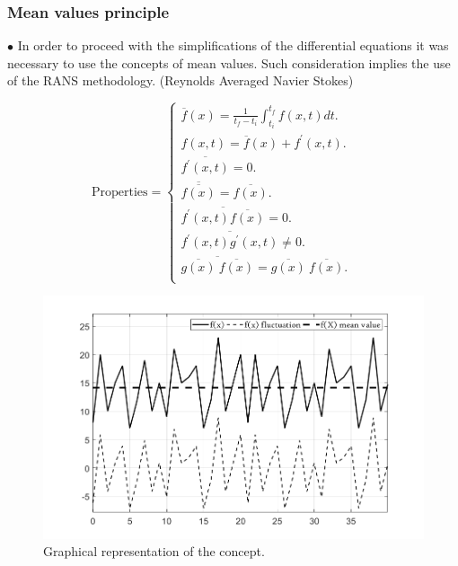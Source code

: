 \documentclass[xcolor=dvipsnames,8pt,aspectratio=34]{beamer}
\begin{document}
		
		
		\begin{frame}
			\frametitle{Mean values principle}
			$\bullet$ 
			In order to proceed with the simplifications of the differential equations it was necessary to use the concepts of mean values. Such consideration implies the use of the RANS methodology. (Reynolds Averaged Navier Stokes)
			\\
			\begin{minipage}[h!]{0.45\textwidth}
				\begin{equation*}
				\label{ola}
				\text{Properties}=
				\begin{cases}
				\overline{f}({x})=\frac{1}{t_f - t_i} \int_{t_i}^{t_f} f({x} , t) dt.      & \quad  \\
				f({x} , t) = \overline{f}({x}) + f^\prime ({x} ,t) . & \quad   \\
				\overline{f^\prime ({x} ,t)} = 0 . & \quad   \\
				\overline{\overline{f({x})}} = \overline{f({x})} . & \quad   \\
				\overline{f^\prime ({x} ,t)\overline{f({x})}} = 0 .& \quad   \\
				\overline{f^\prime ({x} ,t)g^\prime ({x} ,t)} \neq 0 . & \quad   \\
				\overline{  \overline{g({x})} \ \overline{f({x})}  } = {\overline{g({x})}} \ {\overline{f({x})}} . & \quad   \\
				\end{cases}
				\end{equation*}
			\end{minipage}\hfill
			\begin{minipage}[h!]{0.45\textwidth}
				\begin{figure}
					\centering
					\includegraphics[angle=0, scale=0.22]{medios}
					\caption{Graphical representation of the concept.}
					\label{medios}
				\end{figure}
			\end{minipage}
	     	\\
		\end{frame}
	
\end{document}
